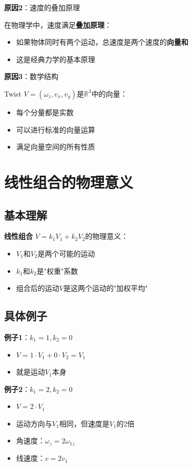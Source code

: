 \documentclass[12pt,a4paper]{article}
\begin{document}
\textbf{原因2}：速度的叠加原理

在物理学中，速度满足\textbf{叠加原理}：
\begin{itemize}
\item 如果物体同时有两个运动，总速度是两个速度的\textbf{向量和}
\item 这是经典力学的基本原理
\end{itemize}

\textbf{原因3}：数学结构

Twist $V = (\omega_z, v_x, v_y)$是$\mathbb{R}^3$中的向量：
\begin{itemize}
\item 每个分量都是实数
\item 可以进行标准的向量运算
\item 满足向量空间的所有性质
\end{itemize}

\section{线性组合的物理意义}

\subsection{基本理解}

\textbf{线性组合} $V = k_1 V_1 + k_2 V_2$的物理意义：

\begin{itemize}
\item $V_1$和$V_2$是两个可能的运动
\item $k_1$和$k_2$是"权重"系数
\item 组合后的运动$V$是这两个运动的"加权平均"
\end{itemize}

\subsection{具体例子}

\textbf{例子1}：$k_1 = 1, k_2 = 0$

\begin{itemize}
\item $V = 1 \cdot V_1 + 0 \cdot V_2 = V_1$
\item 就是运动$V_1$本身
\end{itemize}

\textbf{例子2}：$k_1 = 2, k_2 = 0$

\begin{itemize}
\item $V = 2 \cdot V_1$
\item 运动方向与$V_1$相同，但速度是$V_1$的2倍
\item 角速度：$\omega_z = 2 \omega_{1z}$
\item 线速度：$v = 2 v_1$
\end{itemize}
\end{document}
